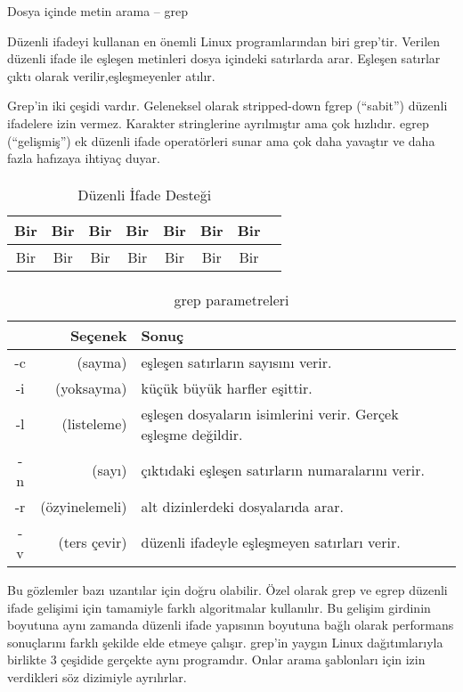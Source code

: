 \documentclass[10pt,a5paper]{book}
\begin{document}
\begin{section}{Dosya içinde metin arama – grep}

Düzenli ifadeyi kullanan en önemli Linux programlarından biri grep’tir. Verilen düzenli ifade ile eşleşen metinleri dosya içindeki satırlarda arar. Eşleşen satırlar çıktı olarak verilir,eşleşmeyenler atılır.

Grep’in iki çeşidi vardır. Geleneksel olarak stripped-down fgrep (“sabit”) düzenli ifadelere izin vermez. Karakter stringlerine ayrılmıştır ama çok hızlıdır. egrep (“gelişmiş”) ek düzenli ifade operatörleri sunar ama çok daha yavaştır ve daha fazla hafızaya ihtiyaç duyar.

\paragraph{}{
\begin {table}[H]
\caption {Düzenli İfade Desteği} \label{tab:title} 
\begin{tabular}{c c c c c c c c}
\hline
Bir & Bir&Bir&Bir&Bir&Bir&Bir\\
\hline
Bir & Bir&Bir&Bir&Bir&Bir&Bir\\
\hline
\end{tabular}
\end {table}
}

\paragraph{}{
\begin {table}[H]
\caption {grep parametreleri} \label{tab:title} 
\begin{tabular}{c r l}
\hline
{} & Seçenek & Sonuç\\
\hline
-c &	(sayma)	&	eşleşen satırların sayısını verir.\\
-i	&(yoksayma)	&küçük büyük harfler eşittir.\\
-l	&(listeleme)&	eşleşen dosyaların isimlerini verir. Gerçek eşleşme değildir.\\
-n	&(sayı)&		çıktıdaki eşleşen satırların numaralarını verir.\\
-r	&(özyinelemeli)&	alt dizinlerdeki dosyalarıda arar.\\
-v&	(ters çevir)&	düzenli ifadeyle eşleşmeyen satırları verir.\\
\hline
\end{tabular}
\end {table}
}

Bu gözlemler bazı uzantılar için doğru olabilir. Özel olarak grep ve egrep düzenli ifade gelişimi için tamamiyle farklı algoritmalar kullanılır. Bu gelişim girdinin boyutuna aynı zamanda düzenli ifade yapısının boyutuna bağlı olarak performans sonuçlarını farklı şekilde elde etmeye çalışır. grep’in yaygın Linux dağıtımlarıyla birlikte 3 çeşidide gerçekte aynı programdır. Onlar arama şablonları için izin verdikleri söz dizimiyle ayrılırlar.


\end{section}
\end{document}
